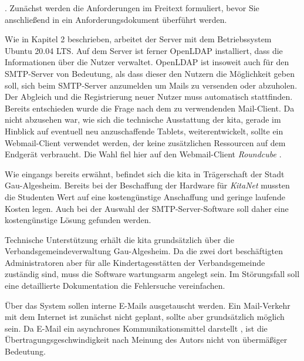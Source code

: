  \citep[][454]{Balzert2010}.
Zunächst werden die Anforderungen im Freitext formuliert, bevor Sie anschließend in ein Anforderungsdokument überführt werden.  

Wie in Kapitel 2 beschrieben, arbeitet der Server mit dem Betriebssystem Ubuntu 20.04 LTS. Auf dem Server ist ferner OpenLDAP installiert, dass die Informationen über die Nutzer verwaltet. OpenLDAP ist insoweit auch für den SMTP-Server von Bedeutung, als dass dieser den Nutzern die Möglichkeit geben soll, sich beim SMTP-Server anzumelden um Mails zu versenden oder abzuholen. Der Abgleich und die Registrierung neuer Nutzer muss automatisch stattfinden.
Bereits entschieden wurde die Frage nach dem zu verwendenden Mail-Client. 
Da nicht abzusehen war, wie sich die technische Ausstattung der \ac{kita}, gerade im Hinblick auf eventuell neu anzuschaffende Tablets, weiterentwickelt, sollte ein Webmail-Client verwendet werden, der keine zusätzlichen Ressourcen auf dem Endgerät verbraucht. Die Wahl fiel hier auf den Webmail-Client \textit{Roundcube} \citep[vgl.][]{roundcubemain}. 

Wie eingangs bereits erwähnt, befindet sich die \ac{kita} in Trägerschaft der Stadt Gau-Algesheim. Bereits bei der Beschaffung der Hardware für \textit{KitaNet} mussten die Studenten Wert auf eine kostengünstige Anschaffung und geringe laufende Kosten legen. Auch bei der Auswahl der SMTP-Server-Software soll daher eine kostengünstige Lösung gefunden werden.

Technische Unterstützung erhält die  \ac{kita} grundsätzlich über die Verbandsgemeindeverwaltung Gau-Algesheim. Da die zwei dort beschäftigten Administratoren aber für alle Kindertagesstätten der Verbandsgemeinde zuständig sind, muss die Software wartungsarm angelegt sein. Im Störungsfall soll eine detaillierte Dokumentation die Fehlersuche vereinfachen.

Über das System sollen interne E-Mails ausgetauscht werden. Ein Mail-Verkehr mit dem Internet ist zunächst nicht geplant, sollte aber grundsätzlich möglich sein.
Da E-Mail ein asynchrones Kommunikationsmittel darstellt \citep[vgl.][10]{Duerscheid2003}, ist die Übertragungsgeschwindigkeit nach Meinung des Autors nicht von übermäßiger Bedeutung. 

